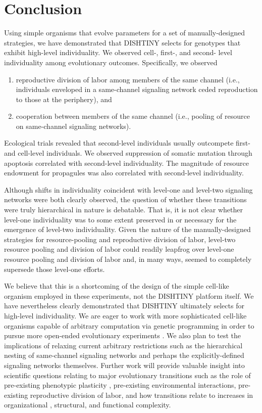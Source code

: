 \section{Conclusion}

Using simple organisms that evolve parameters for a set of manually-designed strategies, we have demonstrated that DISHTINY selects for genotypes that exhibit high-level individuality.
We observed cell-, first-, and second- level individuality among evolutionary outcomes.
Specifically, we observed
\begin{enumerate}
  \item reproductive division of labor among members of the same channel (i.e., individuals enveloped in a same-channel signaling network ceded reproduction to those at the periphery), and
  \item cooperation between members of the same channel (i.e., pooling of resource on same-channel signaling networks).
\end{enumerate}

Ecological trials revealed that second-level individuals usually outcompete first- and cell-level individuals.
We observed suppression of somatic mutation through apoptosis correlated with second-level individuality.
The magnitude of resource endowment for propagules was also correlated with second-level individuality.

Although shifts in individuality coincident with level-one and level-two signaling networks were both clearly observed, the question of whether these transitions were truly hierarchical in nature is debatable.
That is, it is not clear whether level-one individuality was to some extent preserved in or necessary for the emergence of level-two individuality.
Given the nature of the manually-designed strategies for resource-pooling and reproductive division of labor, level-two resource pooling and division of labor could readily leapfrog over level-one resource pooling and division of labor and, in many ways, seemed to completely supersede those level-one efforts.

We believe that this is a shortcoming of the design of the simple cell-like organism employed in these experiments, not the DISHTINY platform itself.
We have nevertheless clearly demonstrated that DISHTINY ultimately selects for high-level individuality.
We are eager to work with more sophisticated cell-like organisms capable of arbitrary computation via genetic programming in order to pursue more open-ended evolutionary experiments \cite{ofria2004avida}.
We also plan to test the implications of relaxing current arbitrary restrictions such as the hierarchical nesting of same-channel signaling networks and perhaps the explicitly-defined signaling networks themselves.
Further work will provide valuable insight into scientific questions relating to major evolutionary transitions such as the role of pre-existing phenotypic plasticity \citep{clune2007investigating, lalejini2016evolutionary}, pre-existing environmental interactions, pre-existing reproductive division of labor, and how transitions relate to increases in organizational \citep{goldsby2012task}, structural, and functional \citep{goldsby2014evolutionary} complexity.

